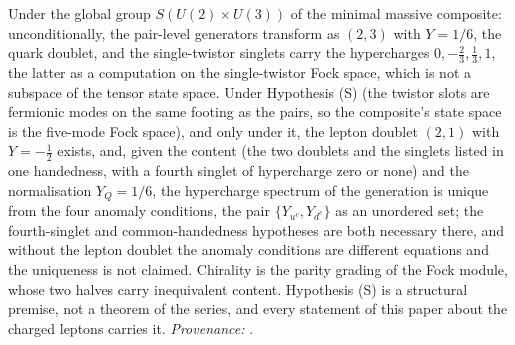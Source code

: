 Under the global group $S(U(2) \times U(3))$ of the minimal massive composite: unconditionally, the pair-level generators transform as $(2,3)$ with $Y = 1/6$, the quark doublet, and the single-twistor singlets carry the hypercharges $0, -\tfrac23, \tfrac13, 1$, the latter as a computation on the single-twistor Fock space, which is not a subspace of the tensor state space. Under Hypothesis (S) (the twistor slots are fermionic modes on the same footing as the pairs, so the composite's state space is the five-mode Fock space), and only under it, the lepton doublet $(2,1)$ with $Y = -\tfrac12$ exists, and, given the content (the two doublets and the singlets listed in one handedness, with a fourth singlet of hypercharge zero or none) and the normalisation $Y_{Q} = 1/6$, the hypercharge spectrum of the generation is unique from the four anomaly conditions, the pair $\{Y_{u^{c}}, Y_{d^{c}}\}$ as an unordered set; the fourth-singlet and common-handedness hypotheses are both necessary there, and without the lepton doublet the anomaly conditions are different equations and the uniqueness is not claimed. Chirality is the parity grading of the Fock module, whose two halves carry inequivalent content. Hypothesis (S) is a structural premise, not a theorem of the series, and every statement of this paper about the charged leptons carries it. \emph{Provenance:} \cite[\S4-\S5, in particular Prop.~5.3, Thm.~5.5, Prop.~5.6]{ButlerT12}.
